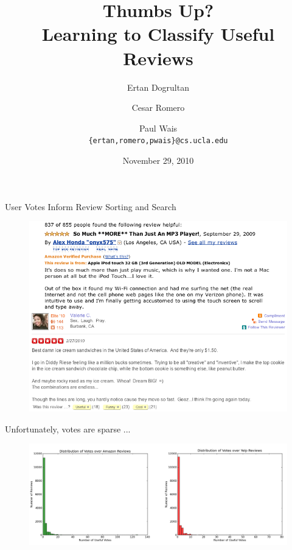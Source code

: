 \documentclass{beamer}
\title{Thumbs Up?  \\ Learning to Classify Useful Reviews}
\author{Ertan Dogrultan \and Cesar Romero \and Paul Wais\\
\texttt{\{ertan,romero,pwais\}@cs.ucla.edu}}
\date{November 29, 2010}
\begin{document}
\maketitle{}

\begin{frame}{User Votes Inform Review Sorting and Search}
\begin{figure}[h]
  \centering
  \includegraphics[scale=.4]{review_ex_1}
  \label{fig:dist}
\end{figure}
\end{frame}

\begin{frame}{Unfortunately, votes are sparse ...}
\begin{figure}[h]
  \centering
  \includegraphics[width=\linewidth]{histos}
  \label{fig:dist}
\end{figure}
\end{frame}
\end{document}
